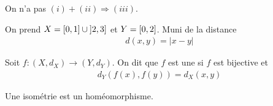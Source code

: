 \documentclass[french,a4paper,10pt]{article}
\begin{document}
		\begin{remark}
			On n'a pas $(i)+(ii)\Longrightarrow(iii)$.
				\begin{example}
					On prend $X=\mathopen{[}0, 1\mathclose{]}\cup \mathopen{]}2, 3\mathclose{]}$ et $Y=\mathopen{[}0, 2\mathclose{]}$. Muni de la distance
						\[\begin{aligned}
							d(x,y)=|x-y|
						\end{aligned}\]
				\end{example}
		\end{remark}
		\begin{definition}
			Soit $f\colon (X,d_X)\to (Y,d_Y)$. On dit que $f$ est une  si $f$ est bijective et
				\[\begin{aligned}
					d_Y(f(x), f(y))=d_X(x,y)
				\end{aligned}\]
		\end{definition}
		\begin{remark}
			Une isométrie est un homéomorphisme.		
		\end{remark}
\end{document}
